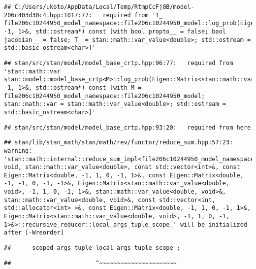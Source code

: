 \documentclass[
]{article}
\begin{document}
\begin{verbatim}
## C:/Users/ukoto/AppData/Local/Temp/RtmpCcFj0B/model-206c403d30c4.hpp:1017:77:   required from 'T_ file206c10244950_model_namespace::file206c10244950_model::log_prob(Eigen::Matrix<T_job_param, -1, 1>&, std::ostream*) const [with bool propto__ = false; bool jacobian__ = false; T_ = stan::math::var_value<double>; std::ostream = std::basic_ostream<char>]'
\end{verbatim}

\begin{verbatim}
## stan/src/stan/model/model_base_crtp.hpp:96:77:   required from 'stan::math::var stan::model::model_base_crtp<M>::log_prob(Eigen::Matrix<stan::math::var_value<double>, -1, 1>&, std::ostream*) const [with M = file206c10244950_model_namespace::file206c10244950_model; stan::math::var = stan::math::var_value<double>; std::ostream = std::basic_ostream<char>]'
\end{verbatim}

\begin{verbatim}
## stan/src/stan/model/model_base_crtp.hpp:93:20:   required from here
\end{verbatim}

\begin{verbatim}
## stan/lib/stan_math/stan/math/rev/functor/reduce_sum.hpp:57:23: warning: 'stan::math::internal::reduce_sum_impl<file206c10244950_model_namespace::partial_log_lik_rsfunctor__, void, stan::math::var_value<double>, const std::vector<int>&, const Eigen::Matrix<double, -1, 1, 0, -1, 1>&, const Eigen::Matrix<double, -1, -1, 0, -1, -1>&, Eigen::Matrix<stan::math::var_value<double, void>, -1, 1, 0, -1, 1>&, stan::math::var_value<double, void>&, stan::math::var_value<double, void>&, const std::vector<int, std::allocator<int> >&, const Eigen::Matrix<double, -1, 1, 0, -1, 1>&, Eigen::Matrix<stan::math::var_value<double, void>, -1, 1, 0, -1, 1>&>::recursive_reducer::local_args_tuple_scope_' will be initialized after [-Wreorder]
\end{verbatim}

\begin{verbatim}
##      scoped_args_tuple local_args_tuple_scope_;
\end{verbatim}

\begin{verbatim}
##                        ^~~~~~~~~~~~~~~~~~~~~~~
\end{verbatim}
\end{document}
